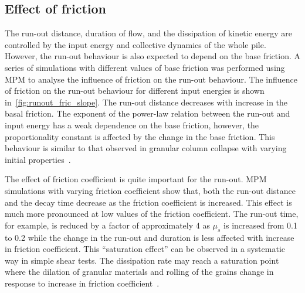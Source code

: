 \documentclass[3p,times,procedia,number]{elsarticle}
\begin{document}
\subsection{Effect of friction}
\label{sec:parameters}

The run-out distance, duration of flow, and the dissipation of kinetic energy 
are controlled by the input energy and collective dynamics of the whole pile. 
However, the run-out behaviour is also expected to depend on the base friction. 
A series of simulations with different values of base friction was performed 
using MPM to analyse the influence of friction on the run-out behaviour. The 
influence of friction on the run-out behaviour for different input energies is 
shown in~\cref{fig:runout_fric_slope}. The run-out distance decreases with 
increase in the basal friction. The exponent of the 
power-law relation between the run-out and input energy has a weak dependence 
on the base friction, however, the proportionality constant is affected by the 
change in the base friction. This behaviour is similar to that observed in 
granular column collapse with varying initial 
properties~\citep{Balmforth2005,Lajeunesse2005}. 

The effect of friction coefficient is quite important for the run-out. MPM
simulations with varying friction coefficient show that, both the run-out
distance and the decay time decrease as the friction coefficient is increased.
This effect is much more pronounced at low values of the friction coefficient.
The run-out time, for example, is reduced by a factor of approximately 4 as
$\mu_s$ is increased from 0.1 to 0.2 while the change in the run-out and
duration is less affected with increase in friction coefficient. This
``saturation effect'' can be observed in a systematic way in simple shear
tests. The dissipation rate may reach a saturation point where the dilation of
granular materials and rolling of the grains change in response to increase in
friction coefficient~\citep{Estrada2008}.
\end{document}

